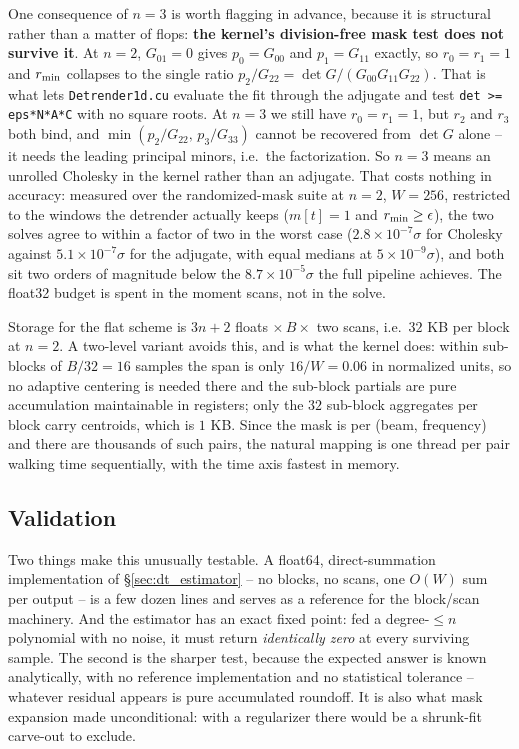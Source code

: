 \documentclass{article}
\numberwithin{equation}{section}   %
\begin{document}
One consequence of $n=3$ is worth flagging in advance, because it is structural rather than a matter of
flops: {\bf the kernel's division-free mask test does not survive it}.  At $n=2$, $G_{01} = 0$ gives
$p_0 = G_{00}$ and $p_1 = G_{11}$ exactly, so $r_0 = r_1 = 1$ and $r_{\rm min}$ collapses to the single ratio
$p_2/G_{22} = \det G/(G_{00}G_{11}G_{22})$.  That is what lets {\tt Detrender1d.cu} evaluate the fit through
the adjugate and test {\tt det >= eps*N*A*C} with no square roots.  At $n=3$ we still have $r_0 = r_1 = 1$,
but $r_2$ and $r_3$ both bind, and $\min(p_2/G_{22},\, p_3/G_{33})$ cannot be recovered from $\det G$ alone --
it needs the leading principal minors, i.e.~the factorization.  So $n=3$ means an unrolled Cholesky in the
kernel rather than an adjugate.  That costs nothing in accuracy: measured over the randomized-mask suite at
$n=2$, $W=256$, restricted to the windows the detrender actually keeps ($m[t]=1$ and $r_{\rm min} \ge
\epsilon$), the two solves agree to within a factor of two in the worst case ($2.8\times10^{-7}\sigma$ for
Cholesky against $5.1\times10^{-7}\sigma$ for the adjugate, with equal medians at $5\times10^{-9}\sigma$),
and both sit two orders of magnitude below the $8.7\times10^{-5}\sigma$ the full pipeline achieves.  The
float32 budget is spent in the moment scans, not in the solve.

Storage for the flat scheme is $3n{+}2$ floats $\times\, B \times$ two scans, i.e.~$32$ KB per block at $n=2$.
A two-level variant avoids this, and is what the kernel does: within sub-blocks of $B/32 = 16$ samples the
span is only $16/W = 0.06$ in normalized units, so no adaptive centering is needed there and the sub-block
partials are pure accumulation maintainable in registers; only the $32$ sub-block aggregates per block carry
centroids, which is $1$ KB.
Since the mask is per (beam, frequency) and there are thousands of such pairs, the natural mapping is one
thread per pair walking time sequentially, with the time axis fastest in memory.

\subsection{Validation}
\label{sec:dt_validation}

Two things make this unusually testable.  A float64, direct-summation implementation of
\S\ref{sec:dt_estimator} -- no blocks, no scans, one $O(W)$ sum per output -- is a few dozen lines and serves as
a reference for the block/scan machinery.  And the estimator has an exact fixed point: fed a degree-$\le n$
polynomial with no noise, it must return {\em identically zero} at every surviving sample.  The second is the
sharper test, because the expected answer is known analytically, with no reference implementation and no
statistical tolerance -- whatever residual appears is pure accumulated roundoff.  It is also what mask expansion
made unconditional: with a regularizer there would be a shrunk-fit carve-out to exclude.
\end{document}
